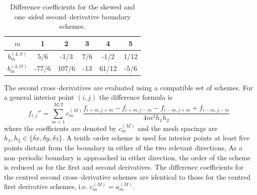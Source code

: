 \documentclass[dvips]{article}
\begin{document}
\begin{table}[htbp]
\begin{center}
\begin{tabular}{|c|c|c|c|c|c|} \hline
$m$              &  1    &  2     &  3   &  4     &  5    \\ \hline
$b_{m}^{(4,S)}$  &  5/6  & -1/3   &  7/6 & -1/2   &  1/12 \\
$b_{m}^{(4,O)}$  & -77/6 &  107/6 & -13  &  61/12 & -5/6  \\ \hline
\end{tabular}
\caption{Difference coefficients for the skewed and one--sided
second--derivative boundary schemes.}
\end{center}
\end{table}

\noindent
The second cross--derivatives are evaluated using a compatible set of
schemes.  For a general interior point $(i,j)$ the difference
formula is
\begin{equation}
f_{i,j}'' = \sum_{m=1}^{M/2} c_{m}^{(M)}
\frac{f_{i+m,j+m} - f_{i+m,j-m}
    - f_{i-m,j+m} + f_{i-m,j-m}}{4m^{2}h_{1}h_{2}}
\end{equation}
where the coefficients are denoted by $c_{m}^{(M)}$ and the mesh spacings are
$h_{1},h_{2}\in\{\delta x,\delta y,\delta z\}$.  A tenth--order
scheme is used for interior points at least five points distant from the
boundary in either of the two relevant directions,  As a non--periodic boundary
is approached in either direction, the order of the scheme is reduced
as for the first and second derivatives.  The difference
coefficients for the centred second cross--derivative schemes are identical to
those for the centred first derivative schemes,
i.e. $c_{m}^{(M)} = a_{m}^{(M)}$.  
\end{document}
